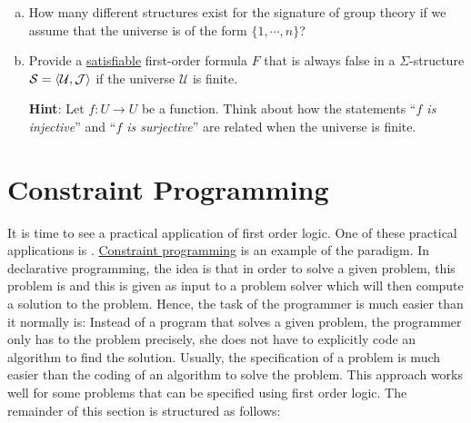 \exerciseEng
\begin{enumerate}[(a)]
\item How many different structures exist for the signature of group theory if we assume that the
      universe is of the form $\{1, \cdots, n\}$?
\item Provide a \underline{satisfiable} first-order formula $F$ that is always false in a 
      $\Sigma$-structure $\mathcal{S} = \pair(\mathcal{U},\mathcal{J})$ if  the universe $\mathcal{U}$ is finite.

      \textbf{Hint}: Let $f: U \rightarrow U$ be a function. Think about how the statements
      ``\emph{$f$ is injective}'' and ``\emph{$f$ is surjective}'' are related when the universe is finite.
      \exend  
\end{enumerate}

\section{Constraint Programming}
It is time to see a practical application of first order logic.  One of these practical applications is .  
\href{https://en.wikipedia.org/wiki/Constraint_programming}{Constraint programming} is an example of the
  paradigm.  In declarative programming, the idea is that 
in order to solve a given problem, this problem is  and this  is
given as input to a problem solver which will then compute a solution to the problem.  Hence, the task of the
programmer is much easier than it normally is: Instead of  a program that solves a given problem,
the programmer only has to  the problem precisely, she does not have to explicitly code an algorithm to find the
solution.  Usually, the specification of a problem is much easier than the coding of an algorithm to solve the problem.  This approach works well for some problems
that can be specified using first order logic.  The remainder of this section is structured as follows:
